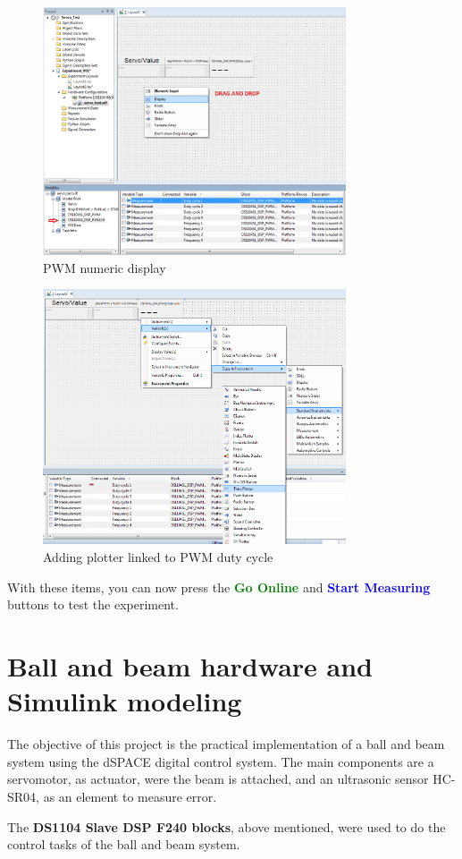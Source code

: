     \begin{figure}[H]
        \centering
        \includegraphics[width=0.8\textwidth]{Images/Ball and Bean/ControlDesk/CD12.png}
        \caption{PWM numeric display}
        \label{fig35}
    \end{figure}
    \begin{figure}[H]
        \centering
        \includegraphics[width=0.8\textwidth]{Images/Ball and Bean/ControlDesk/CD13.png}
        \caption{Adding plotter linked to PWM duty cycle}
        \label{fig36}
    \end{figure}
With these items, you can now press the \textcolor{green}{\textbf{Go Online}} and \textcolor{blue}{\textbf{Start Measuring}} buttons to test the experiment.

\newpage

\section{Ball and beam hardware and Simulink modeling}
The objective of this project is the practical implementation of a ball and beam system using the dSPACE digital control system. The main components are a servomotor, as actuator, were the beam is attached, and an ultrasonic sensor HC-SR04, as an element to measure error. \par
The \textbf{DS1104 Slave DSP F240 blocks}, above mentioned, were used to do the control tasks of the ball and beam system.\par
